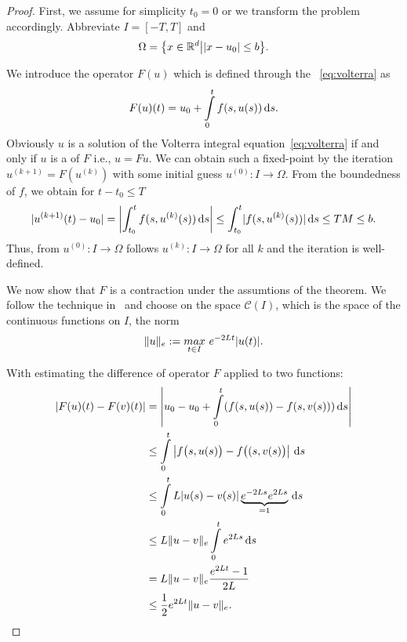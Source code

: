 

\begin{proof}
  First, we assume for simplicity $t_0=0$ or we transform the problem
  accordingly. Abbreviate $I = [-T,T]$ and
  \begin{gather*}
    \Omega = \bigl\{x\in \mathbb R^d\big| \lvert x-u_0\rvert \le b \bigr\}.
  \end{gather*}

  We introduce the operator $F(u)$ which is defined
  through the ~\eqref{eq:volterra} as
  \begin{gather}
    \label{eq:awa:16}
   F(u)(t) = u_0 + \int\limits_{0}^t f(s,u(s)) \,\mathrm{d} s.
  \end{gather}
  Obviously $u$ is a solution of the Volterra integral
  equation~\eqref{eq:volterra} if and only if $u$ is a  of $F$ i.e., $u=Fu$. We can obtain such a fixed-point by
  the iteration $u^{(k+1)} = F(u^{(k)})$ with some initial guess
  $u^{(0)}:I\to\Omega$. From the boundedness of $f$, we obtain for
  $t-t_0 \le T$
  \begin{align*}
    \lvert u^{(k+1)}(t)-u_0\rvert = \left|\int_{t_0}^t f(s,u^{(k)}(s))\,\mathrm{d} s \right| \le \int_{t_0}^t
    \lvert f(s,u^{(k)}(s))\rvert\,\mathrm{d} s \le TM \le b.
  \end{align*}
  Thus, from $u^{(0)}:I\to\Omega$ follows $u^{(k)}:I\to\Omega$ for all
  $k$ and the iteration is well-defined.
  
  We now show that $F$ is a contraction under the assumtions of the
  theorem. We follow the technique
  in~\cite[\S117]{Heuser86} and choose on the space $\mathcal C(I)$,
  which is the space of the continuous functions on $I$, the norm
  \begin{gather*}
    \lVert u\rVert_e := \underset{t \in I}{max} ~e^{-2 L t} |u(t)|.
  \end{gather*}
  
  With estimating the difference of operator $F$ applied to two functions:
  \begin{align*}
    |F(u)(t) - F(v)(t)|
    & = \left| u_0 - u_0 + \int\limits_{0}^t (f(s,u(s)) - f(s,v(s))) \,\mathrm{d} s \right| \\
    & \le \int\limits_{0}^t \left| f\bigl(s,u(s)\bigr) - f\bigl((s,v(s)\bigr) \right| \,\mathrm{d} s \\
    & \le \int\limits_{0}^t L |u(s) - v(s)| \underbrace{e^{-2 L s} e^{2 L s}}_{= 1} \,\mathrm{d} s \\
    & \le L \lVert u-v\rVert_e \int\limits_{0}^t e^{2 L s} \,\mathrm{d} s \\
    & = L \lVert u-v\rVert_e \frac{e^{2 L t} - 1}{2 L} \\
    & \le \frac12 e^{2 L t} \lVert u-v\rVert_e.
  \end{align*}


\end{proof}
